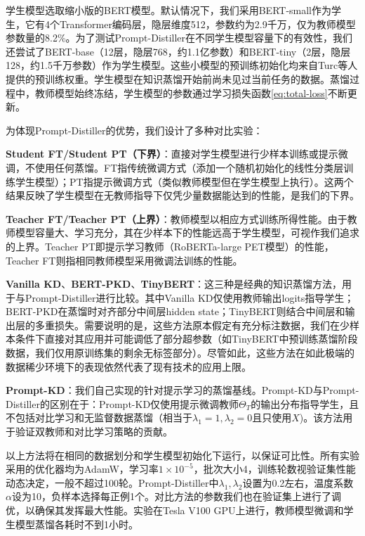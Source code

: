 \documentclass[../main.tex]{subfiles}
\begin{document}
学生模型选取缩小版的BERT模型。默认情况下，我们采用BERT-small作为学生，它有4个Transformer编码层，隐层维度512，参数约为2.9千万，仅为教师模型参数量的8.2\%。为了测试Prompt-Distiller在不同学生模型容量下的有效性，我们还尝试了BERT-base（12层，隐层768，约1.1亿参数）和BERT-tiny（2层，隐层128，约1.5千万参数）作为学生模型。这些小模型的预训练初始化均来自Turc等人提供的预训练权重。学生模型在知识蒸馏开始前尚未见过当前任务的数据。蒸馏过程中，教师模型始终冻结，学生模型的参数通过学习损失函数\eqref{eq:total-loss}不断更新。


为体现Prompt-Distiller的优势，我们设计了多种对比实验：

\textbf{Student FT/Student PT（下界）}：直接对学生模型进行少样本训练或提示微调，不使用任何蒸馏。FT指传统微调方式（添加一个随机初始化的线性分类层训练学生模型）；PT指提示微调方式（类似教师模型但在学生模型上执行）。这两个结果反映了学生模型在无教师指导下仅凭少量数据能达到的性能，是我们的下界。

\textbf{Teacher FT/Teacher PT（上界）}：教师模型以相应方式训练所得性能。由于教师模型容量大、学习充分，其在少样本下的性能远高于学生模型，可视作我们追求的上界。Teacher PT即提示学习教师（RoBERTa-large PET模型）的性能，Teacher FT则指相同教师模型采用微调法训练的性能。

\textbf{Vanilla KD}、\textbf{BERT-PKD}、\textbf{TinyBERT}：这三种是经典的知识蒸馏方法，用于与Prompt-Distiller进行比较。其中Vanilla KD仅使用教师输出logits指导学生；BERT-PKD在蒸馏时对齐部分中间层hidden state；TinyBERT则结合中间层和输出层的多重损失。需要说明的是，这些方法原本假定有充分标注数据，我们在少样本条件下直接对其应用并可能调低了部分超参数（如TinyBERT中预训练蒸馏阶段数据，我们仅用原训练集的剩余无标签部分）。尽管如此，这些方法在如此极端的数据稀少环境下的表现依然代表了现有技术的应用上限。

\textbf{Prompt-KD}：我们自己实现的针对提示学习的蒸馏基线。Prompt-KD与Prompt-Distiller的区别在于：Prompt-KD仅使用提示微调教师$\Theta_T$的输出分布指导学生，且不包括对比学习和无监督数据蒸馏（相当于$\lambda_1=1,\lambda_2=0$且只使用$X$)。该方法用于验证双教师和对比学习策略的贡献。

以上方法将在相同的数据划分和学生模型初始化下运行，以保证可比性。所有实验采用的优化器均为AdamW，学习率$1\times 10^{-5}$，批次大小4，训练轮数视验证集性能动态决定，一般不超过100轮。Prompt-Distiller中$\lambda_1,\lambda_2$设置为0.2左右，温度系数$\alpha$设为10，负样本选择每正例1个。对比方法的参数我们也在验证集上进行了调优，以确保其发挥最大性能。实验在Tesla V100 GPU上进行，教师模型微调和学生模型蒸馏各耗时不到1小时。
\end{document}
